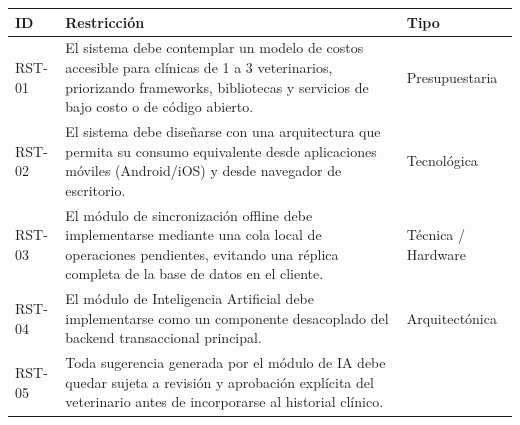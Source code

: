 \documentclass[
]{article}
\newcounter{none} %
\begin{document}
{\def\LTcaptype{none} %
\begin{longtable}[]{|
  >{\raggedright\arraybackslash}p{}|
  >{\raggedright\arraybackslash}p{}|
  >{\raggedright\arraybackslash}p{}|}
\hline
\begin{minipage}[b]{\linewidth}\centering
\textbf{ID}
\end{minipage} & \begin{minipage}[b]{\linewidth}\centering
\textbf{Restricción}
\end{minipage} & \begin{minipage}[b]{\linewidth}\centering
\textbf{Tipo}
\end{minipage} \\
\hline
\endhead
\hline
\endlastfoot
RST-01 & El sistema debe contemplar un modelo de costos accesible para
clínicas de 1 a 3 veterinarios, priorizando frameworks, bibliotecas y
servicios de bajo costo o de código abierto. & \begin{minipage}[t]{\linewidth}\raggedright
Presupuestaria
\end{minipage} \\
\hline
RST-02 & El sistema debe diseñarse con una arquitectura que permita su
consumo equivalente desde aplicaciones móviles (Android/iOS) y desde
navegador de escritorio. & \begin{minipage}[t]{\linewidth}\raggedright
Tecnológica
\end{minipage} \\
\hline
RST-03 & El módulo de sincronización offline debe implementarse
mediante una cola local de operaciones pendientes, evitando una
réplica completa de la base de datos en el cliente. & \begin{minipage}[t]{\linewidth}\raggedright
Técnica / Hardware
\end{minipage} \\
\hline
RST-04 & El módulo de Inteligencia Artificial debe implementarse como
un componente desacoplado del backend transaccional principal. & \begin{minipage}[t]{\linewidth}\raggedright
Arquitectónica
\end{minipage} \\
\hline
RST-05 & Toda sugerencia generada por el módulo de IA debe quedar
sujeta a revisión y aprobación explícita del veterinario antes de
incorporarse al historial clínico. & \begin{minipage}[t]{\linewidth}\raggedright

\end{minipage}
\end{longtable}}
\end{document}
